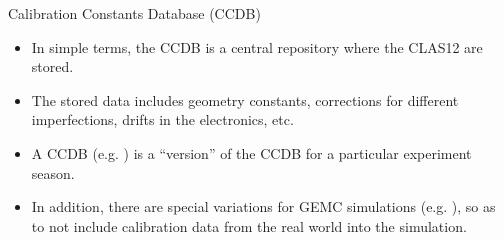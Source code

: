 \begin{frame}{Calibration Constants Database (CCDB)}
    \label{20.07::ccdb}

    \vspace{18pt}

    \begin{itemize}
        \item
            In simple terms, the CCDB is a central repository where the CLAS12  are stored.

        \vspace{12pt}
        \item
            The stored data includes geometry constants, corrections for different imperfections, drifts in the electronics, etc.

        \vspace{12pt}
        \item
            A CCDB  (e.g. ) is a ``version'' of the CCDB for a particular experiment season.

        \vspace{12pt}
        \item
            In addition, there are special variations for GEMC simulations (e.g. ), so as to not include calibration data from the real world into the simulation.
    \end{itemize}

\end{frame}
